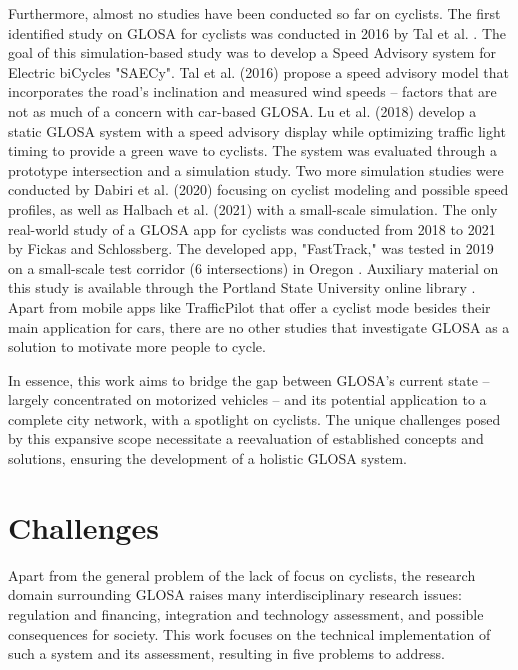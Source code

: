 Furthermore, almost no studies have been conducted so far on cyclists. The first identified study on GLOSA for cyclists was conducted in 2016 by Tal et al. \cite{tal_vehicular-communications-based_2016}. The goal of this simulation-based study was to develop a Speed Advisory system for Electric biCycles "SAECy". Tal et al. (2016) \cite{tal_vehicular-communications-based_2016} propose a speed advisory model that incorporates the road's inclination and measured wind speeds -- factors that are not as much of a concern with car-based GLOSA. Lu et al. (2018) \cite{lu_enhancement_2018} develop a static GLOSA system with a speed advisory display while optimizing traffic light timing to provide a green wave to cyclists. The system was evaluated through a prototype intersection and a simulation study. Two more simulation studies were conducted by Dabiri et al. (2020) \cite{dabiri_optimized_2020} focusing on cyclist modeling and possible speed profiles, as well as Halbach et al. (2021) \cite{halbach_cooperative_2021} with a small-scale simulation. The only real-world study of a GLOSA app for cyclists was conducted from 2018 to 2021 by Fickas and Schlossberg. The developed app, "FastTrack," was tested in 2019 on a small-scale test corridor (6 intersections) in Oregon \cite{fickas_fast_2019}. Auxiliary material on this study is available through the Portland State University online library \cite{fickas_green_2021, fickas_using_2021, fickas_riding_2019, fickas_webinar_2019, fickas_data_2021, fickas_project_2018}. Apart from mobile apps like TrafficPilot that offer a cyclist mode besides their main application for cars, there are no other studies that investigate GLOSA as a solution to motivate more people to cycle. 

In essence, this work aims to bridge the gap between GLOSA's current state -- largely concentrated on motorized vehicles -- and its potential application to a complete city network, with a spotlight on cyclists. The unique challenges posed by this expansive scope necessitate a reevaluation of established concepts and solutions, ensuring the development of a holistic GLOSA system.

\section{Challenges}

Apart from the general problem of the lack of focus on cyclists, the research domain surrounding GLOSA raises many interdisciplinary research issues: regulation and financing, integration and technology assessment, and possible consequences for society. This work focuses on the technical implementation of such a system and its assessment, resulting in five problems to address.

